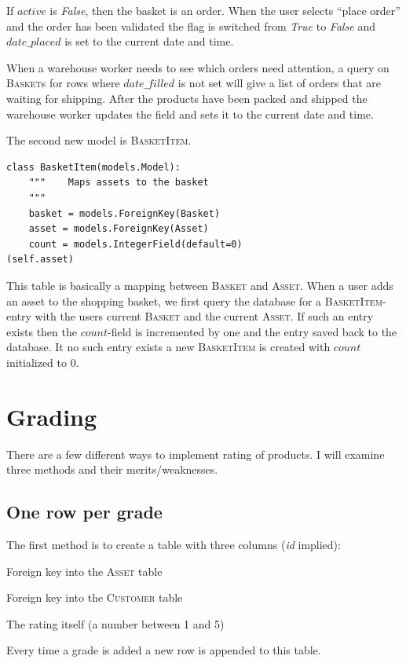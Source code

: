 \documentclass[12pt, a4paper,titlepage]{article}
\begin{document}
If $active$ is \emph{False}, then the basket is an order. When the user selects 
``place order'' and the order has been validated the flag is switched from
\emph{True} to \emph{False} and $date\_placed$ is set to the current date and time.

When a warehouse worker needs to see which orders need attention, a query 
on \textsc{Basket}s for rows where $date\_filled$ is not set will give a list
of orders that are waiting for shipping. After the products have been packed
and shipped the warehouse worker updates the field and sets it to the current
date and time.

The second new model is \textsc{BasketItem}. 
\begin{lstlisting}
class BasketItem(models.Model):    
	"""    Maps assets to the basket
	"""
	basket = models.ForeignKey(Basket)
	asset = models.ForeignKey(Asset)
	count = models.IntegerField(default=0)
(self.asset)
\end{lstlisting}
This table is basically a mapping between \textsc{Basket} and \textsc{Asset}.
When a user adds an asset to the shopping basket, we first query the database
for a \textsc{BasketItem}-entry with the users current \textsc{Basket} and the 
current \textsc{Asset}. If such an entry exists then the $count$-field is
incremented by one and the entry saved back to the database.
It no such entry exists a new \textsc{BasketItem} is created with $count$
initialized to 0.


\section{Grading}

There are a few different ways to implement rating of products. I will examine
three methods and their merits/weaknesses.
\subsection{One row per grade}
The first method is to create a table with three columns (\emph{id} implied): 
\begin{description}
\setlength\itemsep{-7pt}
\item[asset] Foreign key into the \textsc{Asset} table
\item[customer] Foreign key into the \textsc{Customer} table
\item[grade] The rating itself (a number between 1 and 5)
\end{description}
Every time a grade is added a new row is appended to this table.
\end{document}
